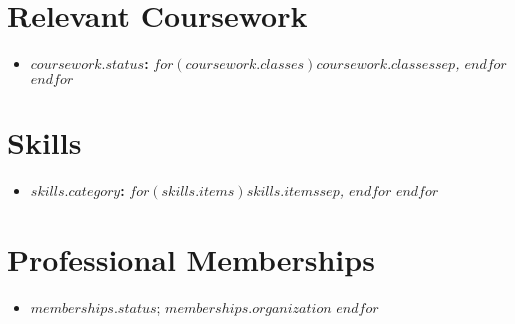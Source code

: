 \documentclass[10pt,letterpaper,sans]{moderncv}
\begin{document}
\section{Relevant Coursework}

\begin{itemize}
$for(coursework)$
    \vspace{2pt}
    \item{
        \textbf{$coursework.status$:}
        \textit{
            $for(coursework.classes)$$coursework.classes$$sep$, $endfor$
        }
    }
$endfor$
\end{itemize}

\section{Skills}

\begin{itemize}
$for(skills)$
    \vspace{3pt}
    \item{
        \textbf{$skills.category$:}
        \textit{
            $for(skills.items)$$skills.items$$sep$, $endfor$
        }
    }
$endfor$
\end{itemize}

\section{Professional Memberships}
\begin{itemize}
$for(memberships)$
    \item {
            $memberships.status$; $memberships.organization$
    }
$endfor$
\end{itemize}
\end{document}
